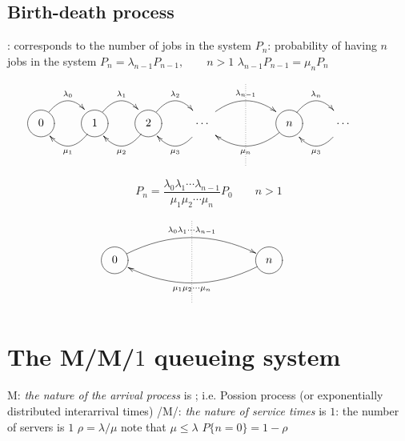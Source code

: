 \documentclass{myart}
\begin{document}
\subsection{Birth-death process}
\bit
\w {}: corresponds to the number of jobs in the system
\w {} $P_n$: probability of having $n$ jobs in the system
	\bit
	\w $P_n = \lambda_{n-1} P_{n-1}, \qquad n > 1$
	\w $\lambda_{n-1} P_{n-1} = \mu_n P_n$
	\eit
\[\xymatrix{
&&&&\ar@{.}[dd]&\\
**{=<2.0pc>[o][F]}{0} \ar@/^1.7pc/[r]^{\lambda_0} &
**{=<2.0pc>[o][F]}{1} \ar@/^1.7pc/[l]^{\mu_1}\ar@/^1.7pc/[r]^{\lambda_1}&
**{=<2.0pc>[o][F]}{2} \ar@/^1.7pc/[l]^{\mu_2}\ar@/^1.7pc/[r]^{\lambda_2}&
**{=<2.0pc>}{\cdots} \ar@/^1.7pc/[rr]^{\lambda_{n-1}}\ar@/^1.7pc/[l]^{\mu_3}&&
**{=<2.0pc>[o][F]}{n} \ar@/^1.7pc/[ll]^{\mu_{n}}\ar@/^1.7pc/[r]^{\lambda_n}&
**{=<2.0pc>}{\cdots} \ar@/^1.7pc/[l]^{\mu_3}&\\
&&&&&
}\]
\w {}
	\[ P_n = \frac{\lambda_0 \lambda_1 \cdots 
		\lambda_{n-1}}{\mu_1 \mu_2 \cdots \mu_n} P_0 \qquad n > 1 \]
\[\xymatrix{
&&\ar@{.}[dd]&\\
**{=<2.0pc>[o][F]}{0} \ar@/^1.7pc/[rrrr]^{\lambda_0\lambda_1\cdots\lambda_{n-1}} &&&&
**{=<2.0pc>[o][F]}{n} \ar@/^1.7pc/[llll]^{\mu_1\mu_2\cdots\mu_n}&\\
&&&
}\]

\eit


\section{The M/M/$1$ queueing system}
\bit
\w M: {\em the nature of the arrival process} is ;
	i.e. Possion process (or exponentially distributed interarrival
	times)
\w /M/: {\em the nature of service times} is 
\w $1$: the number of servers is $1$
\w {} $\rho = \lambda/\mu$
	\bit
	\w note that $\mu \le \lambda$
	\eit  
\w $P\{n = 0\} = 1 - \rho$
\eit




\nocite{Kleinrock75,Jain91}

\end{document}
